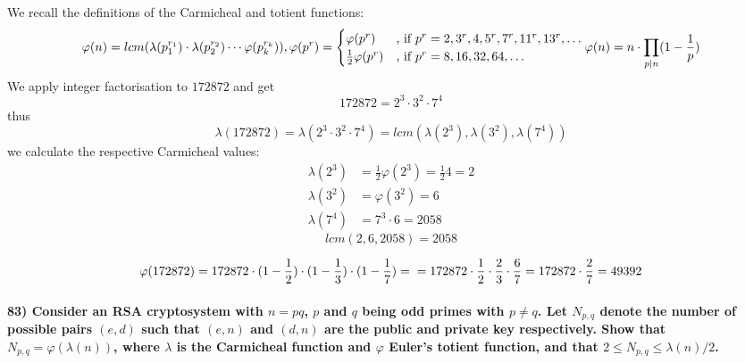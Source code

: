 \documentclass[
]{article}
\begin{document}
We recall the definitions of the Carmicheal and totient functions: \[
\varphi(n) = lcm(\lambda(p_1^{r_1}) \cdot \lambda(p_2^{r_2}) \cdots \varphi(p_k^{r_k})),\\
\varphi(p^r) = 
    \begin{cases} \varphi(p^r) &\text{, if } p^r = 2,3^r,4,5^r,7^r,11^r,13^r, \dots \\
                            \frac{1}{2} \varphi(p^r) &\text{, if } p^r = 8,16,32,64, \dots
    \end{cases}\\
\varphi(n) = n \cdot \prod_{p | n} (1-\frac{1}{p})
\] We apply integer factorisation to \(172872\) and get \[
172872 = 2^3 \cdot 3^2 \cdot 7^4
\] thus \[
\lambda(172872) = \lambda(2^3 \cdot 3^2 \cdot 7^4) = lcm(\lambda(2^3), \lambda(3^2), \lambda(7^4))
\] we calculate the respective Carmicheal values: \[
\begin{aligned}
\lambda(2^3) &= \frac{1}{2} \varphi(2^3) = \frac{1}{2} 4 = 2\\
\lambda(3^2) &= \varphi(3^2) = 6\\
\lambda(7^4) &= 7^3 \cdot 6 = 2058
\end{aligned}
\] \[
lcm(2,6,2058) = 2058
\]

\[
\varphi(172872) = 172872 \cdot (1- \frac{1}{2}) \cdot (1- \frac{1}{3}) \cdot (1- \frac{1}{7}) = \\
= 172872 \cdot \frac{1}{2} \cdot \frac{2}{3} \cdot \frac{6}{7} = 
172872 \cdot \frac{2}{7} = 49392
\]

\hypertarget{consider-an-rsa-cryptosystem-with-n-pq-p-and-q-being-odd-primes-with-p-neq-q.-let-n_pq-denote-the-number-of-possible-pairs-ed-such-that-en-and-dn-are-the-public-and-private-key-respectively.-show-that-n_pq-varphilambdan-where-lambda-is-the-carmicheal-function-and-varphi-eulers-totient-function-and-that-2-leq-n_pq-leq-lambdan2.}{%
\paragraph{\texorpdfstring{83) Consider an RSA cryptosystem with
\(n = pq\), \(p\) and \(q\) being odd primes with \(p \neq q\). Let
\(N_{p,q}\) denote the number of possible pairs \((e,d)\) such that
\((e,n)\) and \((d,n)\) are the public and private key respectively.
Show that \(N_{p,q} = \varphi(\lambda(n))\), where \(\lambda\) is the
Carmicheal function and \(\varphi\) Euler's totient function, and that
\(2 \leq N_{p,q} \leq \lambda(n)/2\).}{83) Consider an RSA cryptosystem with n = pq, p and q being odd primes with p \textbackslash neq q. Let N\_\{p,q\} denote the number of possible pairs (e,d) such that (e,n) and (d,n) are the public and private key respectively. Show that N\_\{p,q\} = \textbackslash varphi(\textbackslash lambda(n)), where \textbackslash lambda is the Carmicheal function and \textbackslash varphi Euler's totient function, and that 2 \textbackslash leq N\_\{p,q\} \textbackslash leq \textbackslash lambda(n)/2.}}\label{consider-an-rsa-cryptosystem-with-n-pq-p-and-q-being-odd-primes-with-p-neq-q.-let-n_pq-denote-the-number-of-possible-pairs-ed-such-that-en-and-dn-are-the-public-and-private-key-respectively.-show-that-n_pq-varphilambdan-where-lambda-is-the-carmicheal-function-and-varphi-eulers-totient-function-and-that-2-leq-n_pq-leq-lambdan2.}}
\end{document}
